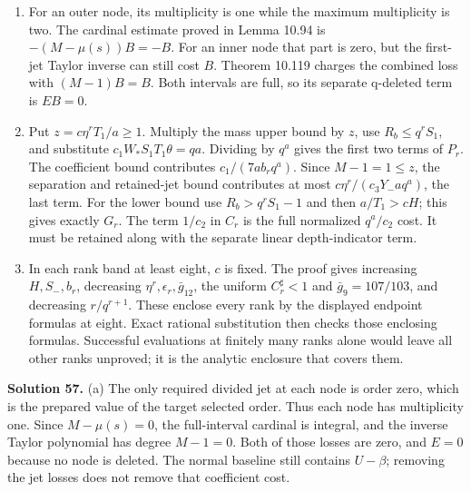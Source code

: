 \documentclass[
  11pt,
  a4paper,
]{article}
\begin{document}
\begin{enumerate}
\def\labelenumi{(\alph{enumi})}
\setcounter{enumi}{1}
\item
  For an outer node, its multiplicity is one while the maximum
  multiplicity is two. The cardinal estimate proved in Lemma 10.94 is
  \(-(M-\mu(s))B=-B\). For an inner node that part is zero, but the
  first-jet Taylor inverse can still cost \(B\). Theorem 10.119 charges
  the combined loss with \((M-1)B=B\). Both intervals are full, so its
  separate q-deleted term is \(EB=0\).
\item
  Put \(z=c\eta^rT_1/a\ge1\). Multiply the mass upper bound by \(z\),
  use \(R_b\le q^rS_1\), and substitute \(c_1W_*S_1T_1\theta=qa\).
  Dividing by \(q^a\) gives the first two terms of \(P_r\). The
  coefficient bound contributes \(c_1/(7ab_rq^a)\). Since
  \(M-1=1\le z\), the separation and retained-jet bound contributes at
  most \(c\eta^r/(c_3Y_-aq^a)\), the last term. For the lower bound use
  \(R_b>q^rS_1-1\) and then \(a/T_1>cH\); this gives exactly \(G_r\).
  The term \(1/c_2\) in \(C_r\) is the full normalized \(q^a/c_2\) cost.
  It must be retained along with the separate linear depth-indicator
  term.
\item
  In each rank band at least eight, \(c\) is fixed. The proof gives
  increasing \(H,S_-,b_r\), decreasing
  \(\eta^r,\epsilon_r,\bar g_{12}\), the uniform \(C_r^\sharp<1\) and
  \(\bar g_9=107/103\), and decreasing \(r/q^{r+1}\). These enclose
  every rank by the displayed endpoint formulas at eight. Exact rational
  substitution then checks those enclosing formulas. Successful
  evaluations at finitely many ranks alone would leave all other ranks
  unproved; it is the analytic enclosure that covers them.
\end{enumerate}

\textbf{Solution 57.} (a) The only required divided jet at each node is
order zero, which is the prepared value of the target selected order.
Thus each node has multiplicity one. Since \(M-\mu(s)=0\), the
full-interval cardinal is integral, and the inverse Taylor polynomial
has degree \(M-1=0\). Both of those losses are zero, and \(E=0\) because
no node is deleted. The normal baseline still contains \(U-\beta\);
removing the jet losses does not remove that coefficient cost.
\end{document}
